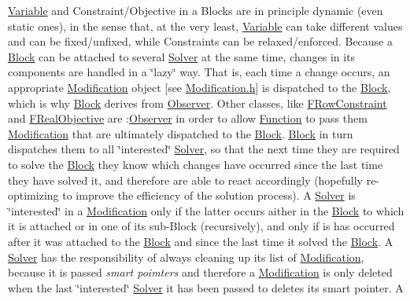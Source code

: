 \mbox{\hyperlink{class_s_m_spp__di__unipi__it_1_1_variable}{Variable}} and Constraint/\+Objective in a Blocks are in principle dynamic (even static ones), in the sense that, at the very least, \mbox{\hyperlink{class_s_m_spp__di__unipi__it_1_1_variable}{Variable}} can take different values and can be fixed/unfixed, while Constraints can be relaxed/enforced. Because a \mbox{\hyperlink{class_s_m_spp__di__unipi__it_1_1_block}{Block}} can be attached to several \mbox{\hyperlink{class_s_m_spp__di__unipi__it_1_1_solver}{Solver}} at the same time, changes in its components are handled in a \char`\"{}lazy\char`\"{} way. That is, each time a change occurs, an appropriate \mbox{\hyperlink{class_s_m_spp__di__unipi__it_1_1_modification}{Modification}} object \mbox{[}see \mbox{\hyperlink{_modification_8h}{Modification.\+h}}\mbox{]} is dispatched to the \mbox{\hyperlink{class_s_m_spp__di__unipi__it_1_1_block}{Block}}, which is why \mbox{\hyperlink{class_s_m_spp__di__unipi__it_1_1_block}{Block}} derives from \mbox{\hyperlink{class_s_m_spp__di__unipi__it_1_1_observer}{Observer}}. Other classes, like \mbox{\hyperlink{class_s_m_spp__di__unipi__it_1_1_f_row_constraint}{F\+Row\+Constraint}} and \mbox{\hyperlink{class_s_m_spp__di__unipi__it_1_1_f_real_objective}{F\+Real\+Objective}} are \+:\mbox{\hyperlink{class_s_m_spp__di__unipi__it_1_1_observer}{Observer}} in order to allow \mbox{\hyperlink{class_s_m_spp__di__unipi__it_1_1_function}{Function}} to pass them \mbox{\hyperlink{class_s_m_spp__di__unipi__it_1_1_modification}{Modification}} that are ultimately dispatched to the \mbox{\hyperlink{class_s_m_spp__di__unipi__it_1_1_block}{Block}}. \mbox{\hyperlink{class_s_m_spp__di__unipi__it_1_1_block}{Block}} in turn dispatches them to all \char`\"{}interested\char`\"{} \mbox{\hyperlink{class_s_m_spp__di__unipi__it_1_1_solver}{Solver}}, so that the next time they are required to solve the \mbox{\hyperlink{class_s_m_spp__di__unipi__it_1_1_block}{Block}} they know which changes have occurred since the last time they have solved it, and therefore are able to react accordingly (hopefully re-\/optimizing to improve the efficiency of the solution process). A \mbox{\hyperlink{class_s_m_spp__di__unipi__it_1_1_solver}{Solver}} is \char`\"{}interested\char`\"{} in a \mbox{\hyperlink{class_s_m_spp__di__unipi__it_1_1_modification}{Modification}} only if the latter occurs aither in the \mbox{\hyperlink{class_s_m_spp__di__unipi__it_1_1_block}{Block}} to which it is attached or in one of its sub-\/\+Block (recursively), and only if is has occurred after it was attached to the \mbox{\hyperlink{class_s_m_spp__di__unipi__it_1_1_block}{Block}} and since the last time it solved the \mbox{\hyperlink{class_s_m_spp__di__unipi__it_1_1_block}{Block}}. A \mbox{\hyperlink{class_s_m_spp__di__unipi__it_1_1_solver}{Solver}} has the responsibility of always cleaning up its list of \mbox{\hyperlink{class_s_m_spp__di__unipi__it_1_1_modification}{Modification}}, because it is passed {\itshape smart poimters} and therefore a \mbox{\hyperlink{class_s_m_spp__di__unipi__it_1_1_modification}{Modification}} is only deleted when the last \char`\"{}interested\char`\"{} \mbox{\hyperlink{class_s_m_spp__di__unipi__it_1_1_solver}{Solver}} it has been passed to deletes its smart pointer. A 
